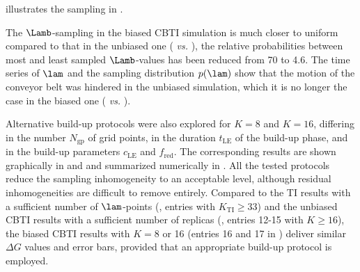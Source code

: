  illustrates the sampling in .
%

The $\Lamb$-sampling in the biased CBTI simulation is 
much closer to uniform compared to that in the unbiased 
one
( \textit{vs.} ),
\ie{} the relative probabilities between most and least sampled $\Lamb$-values has been reduced
from 70 to 4.6. 
The time series of $\lam$ and the sampling distribution $p(\lam)$ show that the 
motion of the conveyor belt was hindered in the unbiased simulation,
which it is no longer the case in the biased one ( 
\textit{vs.} ).

Alternative  build-up protocols were also
explored for $K=8$ and $K=16$, differing in the number $N_{\mathrm{gp}}$ of grid points,
in the duration $t_{\mathrm{LE}}$ of the build-up phase, and in the build-up parameters
$c_{\mathrm{LE}}$ and $f_{\mathrm{red}}$. The corresponding results are shown graphically in  and  and summarized numerically
in . All the tested protocols reduce the sampling inhomogeneity to an acceptable level,
although residual inhomogeneities are difficult to remove entirely. Compared to the TI results
with a sufficient number of $\lam$-points (, entries with $K_{\mathrm{TI}}\geq 33$) and the unbiased
CBTI results with a sufficient
number of replicas (, entries 12-15 with $K\geq 16$), the biased
CBTI results with $K=8$ or 16 (entries 16 and 17 in ) 
deliver similar $\Delta G$ values and error bars, provided that 
an appropriate
build-up protocol is employed. 

